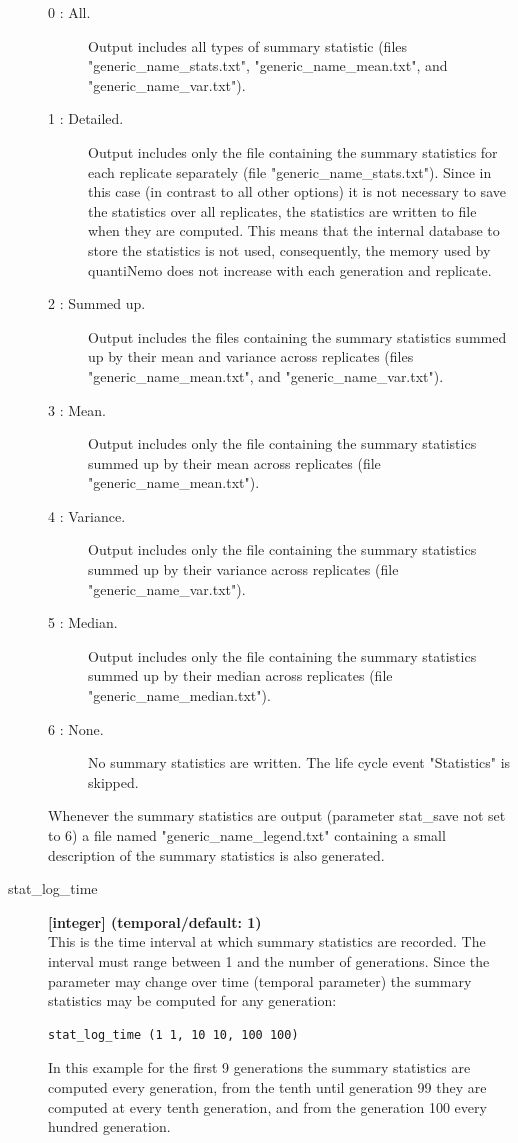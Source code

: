 \documentclass[letterpaper,12pt,oneside]{book}
\begin{document}
\begin{description}
\begin{description}
\item[0 : All.] Output includes all types of summary statistic (files "generic\_name\_stats.txt", "generic\_name\_mean.txt", and "generic\_name\_var.txt").
\item[1 : Detailed.] Output includes only the file containing the summary statistics for each replicate separately (file "generic\_name\_stats.txt"). Since in this case (in contrast to all other options) it is not necessary to save the statistics over all replicates, the statistics are written to file when they are computed. This means that the internal database to store the statistics is not used, consequently, the memory used by quantiNemo does not increase with each generation and replicate.
\item[2 : Summed up.] Output includes the files containing the summary statistics summed up by their mean and variance across replicates (files "generic\_name\_mean.txt", and "generic\_name\_var.txt"). 
\item[3 : Mean.] Output includes only the file containing the summary statistics summed up by their mean across replicates (file "generic\_name\_mean.txt").
\item[4 : Variance.] Output includes only the file containing the summary statistics summed up by their variance across replicates (file "generic\_name\_var.txt").
\item[5 : Median.] Output includes only the file containing the summary statistics summed up by their median across replicates (file "generic\_name\_median.txt").
\item[6 : None.] No summary statistics are written. The life cycle event "Statistics" is skipped.
\end{description}
Whenever the summary statistics are output (parameter \textsf{stat\_save} not set to 6) a file named "generic\_name\_legend.txt" containing a small description of the summary statistics is also generated.
 
\item[stat\_log\_time\index{stat\_log\_time}] \textbf{[integer] (temporal/default: 1)}\\
This is the time interval at which summary statistics are recorded. The interval must range between 1 and the number of generations. Since the parameter may change over time (temporal parameter) the summary statistics may be computed for any generation:
\begin{lstlisting}[frame=single]
stat_log_time (1 1, 10 10, 100 100) 
\end{lstlisting}
In this example for the first 9 generations the summary statistics are computed every generation, from the tenth until generation 99 they are computed at every tenth generation, and from the generation 100 every hundred generation. 


\end{description}
\end{document}
